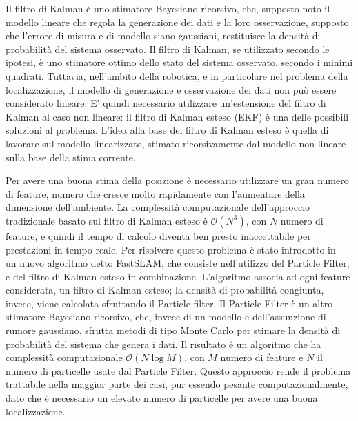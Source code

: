Il filtro di Kalman è uno stimatore Bayesiano ricorsivo, che, supposto noto il modello lineare che regola la generazione dei dati e la loro osservazione, supposto che l'errore di misura e di modello siano gaussiani, restituisce la densità di probabilità del sistema osservato. 
Il filtro di Kalman, se utilizzato secondo le ipotesi, è uno stimatore ottimo dello stato del sistema osservato, secondo i minimi quadrati.
Tuttavia, nell'ambito della robotica, e in particolare nel problema della localizzazione, il modello di generazione e osservazione dei dati non può essere considerato lineare.
E' quindi necessario utilizzare un'estensione del filtro di Kalman al caso non lineare: il filtro di Kalman esteso (EKF) è una delle possibili soluzioni al problema. 
L'idea alla base del filtro di Kalman esteso è quella di lavorare sul modello linearizzato, stimato ricorsivamente dal modello non lineare sulla base della stima corrente.

Per avere una buona stima della posizione è necessario utilizzare un gran numero di feature, numero che cresce molto rapidamente con l'aumentare della dimensione dell'ambiente.
La complessità computazionale dell'approccio tradizionale basato sul filtro di Kalman esteso è $\mathcal{O}(N^3)$, con $N$ numero di feature, e quindi il tempo di calcolo diventa ben presto inaccettabile per prestazioni in tempo reale.
Per risolvere questo problema è stato introdotto in~\cite{Montemerlo02a} un nuovo algoritmo detto FastSLAM, che consiste nell'utilizzo del Particle Filter, e del filtro di Kalman esteso in combinazione. L'algoritmo associa ad ogni feature considerata, un filtro di Kalman esteso; la densità di probabilità congiunta, invece, viene calcolata sfruttando il Particle filter. 
Il Particle Filter è un altro stimatore Bayesiano ricorsivo, che, invece di un modello e dell'assunzione di rumore gaussiano, sfrutta metodi di tipo Monte Carlo per stimare la densità di probabilità del sistema che genera i dati.
Il risultato è un algoritmo che ha complessità computazionale $\mathcal{O}(N\log M)$, con $M$ numero di feature e $N$ il numero di particelle usate dal Particle Filter. 
Questo approccio rende il problema trattabile nella maggior parte dei casi, pur essendo pesante computazionalmente, dato che è necessario un elevato numero di particelle per avere una buona localizzazione.


